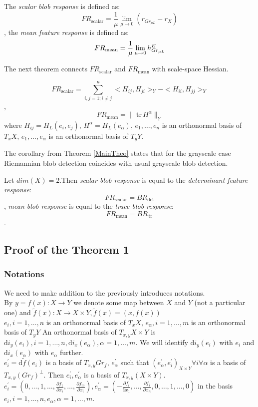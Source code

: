 \documentclass{llncs}
\newcommand{\partderiv}[2]{\frac{\partial #1}{\partial #2}}
\newcommand{\Diff}{\mathrm{d}}
\newcommand{\TangentSpaceArg}[2]{{T_{#2}}{#1}}
\newcommand{\FRScalar}{FR_{\mathrm{scalar}}}
\newcommand{\FRMean}{FR_{\mathrm{mean}}}
\newcommand {\tr}{{\,}\mathrm{tr}{\,}}
\begin{document}
\begin{definition} \label{RiemanDef}
The \emph{scalar blob response} is defined as:
$$\FRScalar=\frac{1}{\mu}\lim_{\mu\to 0} ( r_{Gr_{\mu L}} - r_X )$$,
the \emph{mean feature response} is defined as:
$$\FRMean=\frac{1}{\mu}\lim_{\mu\to 0} \tensor*{h}{^E_{Gr_{\mu L}}}$$
\end{definition}

The next theorem connects $\FRScalar$ and $\FRMean$ with scale-space Hessian.

\begin{theorem} \label{MainTheo}
$$\FRScalar=\sum_{i,j=1; i\ne j}^{n}{<H_{ij},H_{ji}>_Y-<H_{ii},H_{jj}>_Y}$$,
$$\FRMean=\|\tr H^\alpha\|_Y$$
where $H_{ij}=H_L (e_i,e_j)$, $H^\alpha=H_L (e_\alpha)$, 
$e_1,\dots,e_n$ is an orthonormal basis of $\TangentSpaceArg{X}{x}$, $e_1,\dots,e_\alpha$ is an orthonormal basis of $\TangentSpaceArg{Y}{y}$.
\end{theorem}

The corollary from Theorem \ref{MainTheo} states that for the grayscale case Riemannian blob detection coincides with usual grayscale blob detection.

\begin{corollary}\label{GrayscaleCol}
Let $dim(X)=2$.Then \emph{scalar blob response} is equal to the \emph{determinant feature response}:
$$\FRScalar=BR_{\det}$$,
\emph{mean blob response} is equal to the \emph{trace blob response}:
$$\FRMean=BR_{\tr}$$.
\end{corollary}

\subsection{Proof of the Theorem 1}
\subsubsection{Notations}
We need to make addition to the previously introduces notations.
\\
By $y = f(x):X\to Y$ we denote some map between $X$ and $Y$ (not a particular one) and $\tilde{f}(x):X \to X\times Y, \tilde{f}(x)=(x,f(x))$
\\
${e_i, i=1, …,n}$ is an orthonormal basis of $T_x X$, ${e_\alpha, i=1, …,m}$ is an orthonormal basis of $T_y Y$
An orthonormal basis of $T_{x,y} X\times Y$ is ${\Diff i_y(e_i), i=1,\dots,n, \Diff i_x(e_\alpha),\alpha=1,\dots,m}$. We will identify $\Diff i_y(e_i)$ with $e_i$ and $\Diff i_x(e_\alpha)$ with $e_\alpha$ further. 
\\
$e_i^{'}=\Diff \tilde{f}(e_i)$ is a basis of $T_{x, y} Gr_f$, 
$e_\alpha^{'}$ such that $(e_\alpha^{'},e_i^{'})_{X\times Y} \forall i \forall \alpha$ is a basis of $T_{x, y} (Gr_f)^{\bot}$. Then $e_i^{'}, e_\alpha^{'}$ is a basis of $T_{x,y}(X\times Y)$. $e_i^{'} = (0,\dots,1, \dots, \partderiv{f_1}{x_i}, \dots, \partderiv{f_m}{x_i}), 
e_{\alpha}^{'}=(-\partderiv{f_i}{x_1}, \dots, \partderiv{f_i}{x_n}, 0,\dots,1, \dots,0)$ in the basis ${e_i, i=1,\dots,n, e_\alpha,\alpha=1,\dots,m}$.
\end{document}
